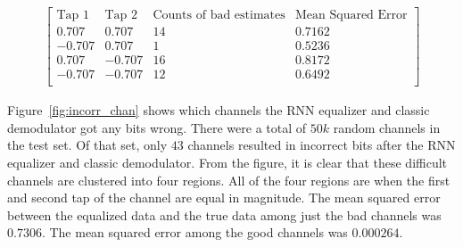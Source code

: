 \begin{align*}
\begin{bmatrix}
\text{Tap 1} & \text{Tap 2} & \text{Counts of bad estimates} & \text{Mean Squared Error}\\
\hline
0.707 & 0.707 & 14 & 0.7162\\
-0.707 & 0.707 & 1 & 0.5236\\
0.707 & -0.707 & 16 & 0.8172\\
-0.707 & -0.707 & 12 & 0.6492\\
\end{bmatrix}
\end{align*}

Figure~\ref{fig:incorr_chan} shows which channels the RNN equalizer and classic demodulator got any bits wrong.  
There were a total of $50k$ random channels in the test set.  
Of that set, only $43$ channels resulted in incorrect bits after the RNN equalizer and classic demodulator.
From the figure, it is clear that these difficult channels are clustered into four regions. All of the four regions are when the first and second tap of the channel are equal in magnitude.
The mean squared error between the equalized data and the true data among just the bad channels was $0.7306$.  The mean squared error among the good channels was $0.000264$.



